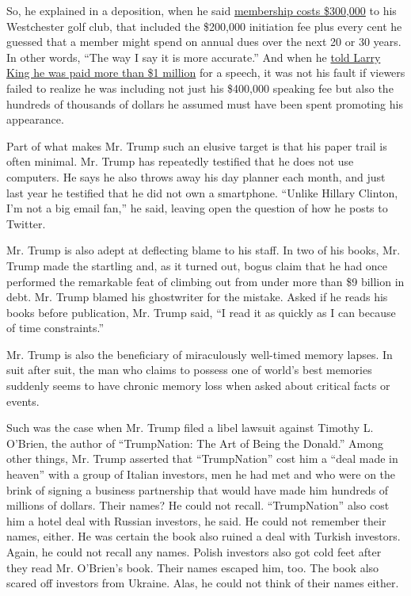 So, he explained in a deposition, when he said
\href{https://books.google.com/books?id=Fo_l25-54sQC\&pg=PA46\&lpg=PA46\&dq=Trump+101:+How+to+Get+Rich+Membership+costs+$300,000.+I+think+it\%E2\%80\%99s+a+bargain\&source=bl\&ots=MgDzJ-CmYk\&sig=pwudPB88zsdU4fhWo-8-V3_-AC8\&hl=en\&sa=X\&ved=0ahUKEwiHip7V1PPNAhWDQCYKHYCDBvYQ6AEIHjAA\#v=onepage\&q=Trump\%20101\%3A\%20How\%20to\%20Get\%20Rich\%20Membership\%20costs\%20\%24300\%2C000.\%20I\%20think\%20it\%E2\%80\%99s\%20a\%20bargain\&f=false}{membership
costs \$300,000} to his Westchester golf club, that included the
\$200,000 initiation fee plus every cent he guessed that a member might
spend on annual dues over the next 20 or 30 years. In other words, ``The
way I say it is more accurate.'' And when he
\href{http://www.cnn.com/TRANSCRIPTS/0603/09/lkl.01.html}{told Larry
King he was paid more than \$1 million} for a speech, it was not his
fault if viewers failed to realize he was including not just his
\$400,000 speaking fee but also the hundreds of thousands of dollars he
assumed must have been spent promoting his appearance.

Part of what makes Mr. Trump such an elusive target is that his paper
trail is often minimal. Mr. Trump has repeatedly testified that he does
not use computers. He says he also throws away his day planner each
month, and just last year he testified that he did not own a smartphone.
``Unlike Hillary Clinton, I'm not a big email fan,'' he said, leaving
open the question of how he posts to Twitter.

Mr. Trump is also adept at deflecting blame to his staff. In two of his
books, Mr. Trump made the startling and, as it turned out, bogus claim
that he had once performed the remarkable feat of climbing out from
under more than \$9 billion in debt. Mr. Trump blamed his ghostwriter
for the mistake. Asked if he reads his books before publication, Mr.
Trump said, ``I read it as quickly as I can because of time
constraints.''

Mr. Trump is also the beneficiary of miraculously well-timed memory
lapses. In suit after suit, the man who claims to possess one of world's
best memories suddenly seems to have chronic memory loss when asked
about critical facts or events.

Such was the case when Mr. Trump filed a libel lawsuit against Timothy
L. O'Brien, the author of ``TrumpNation: The Art of Being the Donald.''
Among other things, Mr. Trump asserted that ``TrumpNation'' cost him a
``deal made in heaven'' with a group of Italian investors, men he had
met and who were on the brink of signing a business partnership that
would have made him hundreds of millions of dollars. Their names? He
could not recall. ``TrumpNation'' also cost him a hotel deal with
Russian investors, he said. He could not remember their names, either.
He was certain the book also ruined a deal with Turkish investors.
Again, he could not recall any names. Polish investors also got cold
feet after they read Mr. O'Brien's book. Their names escaped him, too.
The book also scared off investors from Ukraine. Alas, he could not
think of their names either.

